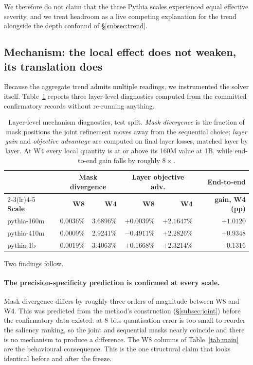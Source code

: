 We therefore do not claim that the three Pythia scales experienced equal effective severity,
and we treat headroom as a live competing explanation for the trend alongside the depth
confound of \S\ref{subsec:trend}.

\subsection{Mechanism: the local effect does not weaken, its translation does}
\label{subsec:mechanism}

Because the aggregate trend admits multiple readings, we instrumented the solver itself.
Table~\ref{tab:mechanism} reports three layer-level diagnostics computed from the committed
confirmatory records without re-running anything.

\begin{table}[t]
\centering
\caption{Layer-level mechanism diagnostics, test split. \emph{Mask divergence} is the
fraction of mask positions the joint refinement moves away from the sequential choice;
\emph{layer gain} and \emph{objective advantage} are computed on final layer losses, matched
layer by layer. At W4 every local quantity is at or above its 160M value at 1B, while
end-to-end gain falls by roughly $8\times$.}
\label{tab:mechanism}
\begin{tabular}{@{}lrrrrr@{}}
\toprule
& \multicolumn{2}{c}{\textbf{Mask divergence}} & \multicolumn{2}{c}{\textbf{Layer objective adv.}} & \textbf{End-to-end} \\
\cmidrule(lr){2-3}\cmidrule(lr){4-5}
\textbf{Scale} & \textbf{W8} & \textbf{W4} & \textbf{W8} & \textbf{W4} & \textbf{gain, W4 (pp)} \\
\midrule
pythia-160m & 0.0036\% & 3.6896\% & $+0.0039\%$ & $+2.1647\%$ & $+1.0120$ \\
pythia-410m & 0.0009\% & 2.9241\% & $-0.4911\%$ & $+2.2826\%$ & $+0.9348$ \\
pythia-1b   & 0.0019\% & 3.4063\% & $+0.1668\%$ & $+2.3214\%$ & $+0.1316$ \\
\bottomrule
\end{tabular}
\end{table}

Two findings follow.

\paragraph{The precision-specificity prediction is confirmed at every scale.} Mask divergence
differs by roughly three orders of magnitude between W8 and W4. This was predicted from the
method's construction (\S\ref{subsec:joint}) before the confirmatory data existed: at 8 bits
quantisation error is too small to reorder the saliency ranking, so the joint and sequential
masks nearly coincide and there is no mechanism to produce a difference. The W8 columns of
Table~\ref{tab:main} are the behavioural consequence. This is the one structural claim that
looks identical before and after the freeze.

